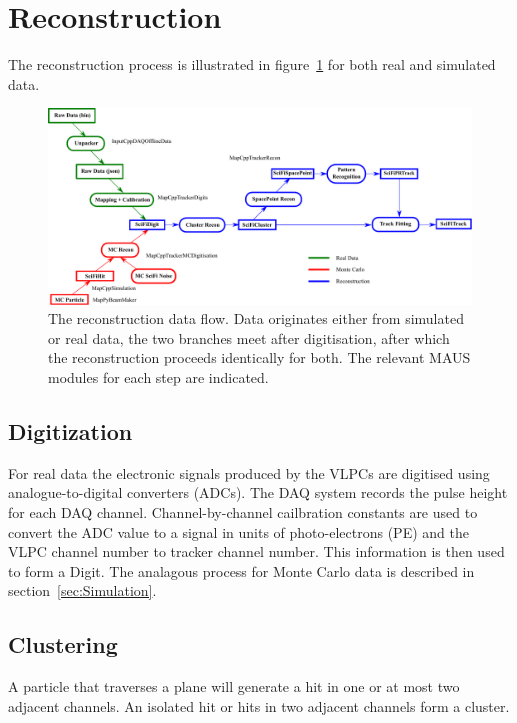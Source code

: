\section{Reconstruction}
\label{sec:Reconstruction}
The reconstruction process is illustrated in figure~\ref{fig:DataFlow} for both real and simulated data.

\begin{figure}[tbh]
  \begin{center}
    \includegraphics[width=0.95\linewidth]{07-Reconstruction/DataFlow2014.pdf}
    \caption{\label{fig:DataFlow} The reconstruction data flow. Data originates either from simulated or real data, the two branches meet after digitisation, after which the reconstruction proceeds identically for both.  The relevant MAUS modules for each step are indicated.}
  \end{center}
\end{figure}

  \subsection{Digitization}
  \label{subsec:Digitization}
  For real data the electronic signals produced by the VLPCs are digitised using analogue-to-digital converters (ADCs). The DAQ system records the pulse height for each DAQ channel.  Channel-by-channel cailbration constants are used to convert the ADC value to a signal in units of photo-electrons (PE) and the VLPC channel number to tracker channel number.  This information is then used to form a Digit.  The analagous process for Monte Carlo data is described in section~\ref{sec:Simulation}.

  \subsection{Clustering}
  \label{subsec:Clustering}
  A particle that traverses a plane will generate a hit in one or at most two adjacent channels.  An isolated hit or hits in two adjacent channels form a cluster.  
  
